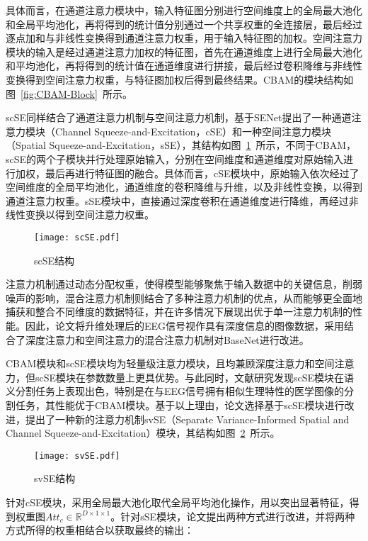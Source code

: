 具体而言，在通道注意力模块中，输入特征图分别进行空间维度上的全局最大池化和全局平均池化，再将得到的统计值分别通过一个共享权重的全连接层，最后经过逐点加和与非线性变换得到通道注意力权重，用于输入特征图的加权。空间注意力模块的输入是经过通道注意力加权的特征图，首先在通道维度上进行全局最大池化和平均池化，再将得到的统计值在通道维度进行拼接，最后经过卷积降维与非线性变换得到空间注意力权重，与特征图加权后得到最终结果。CBAM的模块结构如图~\ref{fig:CBAM-Block}~所示。

scSE同样结合了通道注意力机制与空间注意力机制，基于SENet提出了一种通道注意力模块（Channel Squeeze-and-Excitation，cSE）和一种空间注意力模块（Spatial Squeeze-and-Excitation，sSE），其结构如图~\ref{fig:scSE}~所示，不同于CBAM，scSE的两个子模块并行处理原始输入，分别在空间维度和通道维度对原始输入进行加权，最后再进行特征图的融合。具体而言，cSE模块中，原始输入依次经过了空间维度的全局平均池化，通道维度的卷积降维与升维，以及非线性变换，以得到通道注意力权重。sSE模块中，直接通过深度卷积在通道维度进行降维，再经过非线性变换以得到空间注意力权重。
\begin{figure}
    \centering
    \texttt{[image: scSE.pdf]}
    \caption{scSE结构\cite{roy2018concurrent}}
    \label{fig:scSE}
\end{figure}

注意力机制通过动态分配权重，使得模型能够聚焦于输入数据中的关键信息，削弱噪声的影响，混合注意力机制则结合了多种注意力机制的优点，从而能够更全面地捕获和整合不同维度的数据特征，并在许多情况下展现出优于单一注意力机制的性能。因此，论文将升维处理后的EEG信号视作具有深度信息的图像数据，采用结合了深度注意力和空间注意力的混合注意力机制对BaseNet进行改进。

CBAM模块和scSE模块均为轻量级注意力模块，且均兼顾深度注意力和空间注意力，但scSE模块在参数数量上更具优势。与此同时，文献\cite{roy2018concurrent}研究发现scSE模块在语义分割任务上表现出色，特别是在与EEG信号拥有相似生理特性的医学图像的分割任务，其性能优于CBAM模块。基于以上理由，论文选择基于scSE模块进行改进，提出了一种新的注意力机制svSE（Separate Variance-Informed Spatial and Channel Squeeze-and-Excitation）模块，其结构如图~\ref{fig:svSE}~所示。
\begin{figure}
    \centering
    \texttt{[image: svSE.pdf]}
    \caption{svSE结构}
    \label{fig:svSE}
\end{figure}

针对cSE模块，采用全局最大池化取代全局平均池化操作，用以突出显著特征，得到权重图\(Att_c \in \mathbb{R}^{D \times 1 \times 1}\)。针对sSE模块，论文提出两种方式进行改进，并将两种方式所得的权重相结合以获取最终的输出：

